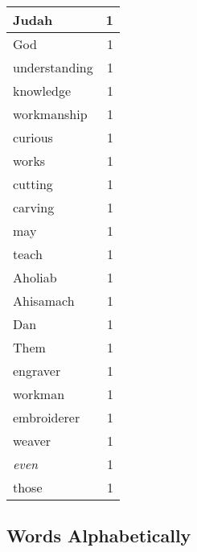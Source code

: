 \begin{center}
\begin{longtable}{l|r}
Judah & 1 \\ \hline
God & 1 \\ \hline
understanding & 1 \\ \hline
knowledge & 1 \\ \hline
workmanship & 1 \\ \hline
curious & 1 \\ \hline
works & 1 \\ \hline
cutting & 1 \\ \hline
carving & 1 \\ \hline
may & 1 \\ \hline
teach & 1 \\ \hline
Aholiab & 1 \\ \hline
Ahisamach & 1 \\ \hline
Dan & 1 \\ \hline
Them & 1 \\ \hline
engraver & 1 \\ \hline
workman & 1 \\ \hline
embroiderer & 1 \\ \hline
weaver & 1 \\ \hline
\emph{even} & 1 \\ \hline
those & 1 \\ \hline
\end{longtable}
\end{center}



\normalsize



\subsection{Words Alphabetically}

